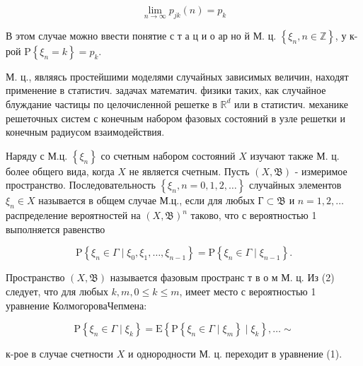 \documentclass[10pt]{article}
\begin{document}
\[

\lim _{n \rightarrow \infty} p_{j k}(n)=p_{k}

\]



В этом случае можно ввести понятие с т а ц и о ар но й М. ц. $\left\{\xi_{n}, n \in \mathbb{Z}\right\}$, у к-рой $\mathrm{P}\left\{\xi_{n}=k\right\}=p_{k}$.



М. ц., являясь простейшими моделями случайных зависимых величин, находят применение в статистич. задачах математич. физики таких, как случайное блуждание частицы по целочисленной решетке в $\mathbb{R}^{d}$ или в статистич. механике решеточных систем с конечным набором фазовых состояний в узле решетки и конечным радиусом взаимодействия.



Наряду с М.ц. $\left\{\xi_{n}\right\}$ со счетным набором состояний $X$ изучают также М. ц. более общего вида, когда $X$ не является счетным. Пусть $(X, \mathfrak{B})$ - измеримое пространство. Последовательность $\left\{\xi_{n}, n=0,1,2, \ldots\right\}$ случайных элементов $\xi_{n} \in X$ называется в общем случае М.ц., если для любых $Г \subset \mathfrak{B}$ и $n=1,2, \ldots$ распределение вероятностей на $(X, \mathfrak{B})^{n}$ таково, что с вероятностью 1 выполняется равенство



\[

\mathrm{P}\left\{\xi_{n} \in \Gamma \mid \xi_{0}, \xi_{1}, \ldots, \xi_{n-1}\right\}=\mathrm{P}\left\{\xi_{n} \in \Gamma \mid \xi_{n-1}\right\} .

\]



Пространство $(X, \mathfrak{B})$ называется фазовым пространс т в о м М. ц. Из (2) следует, что для любых $k, m, 0 \leqslant k \leqslant m$, имеет место с вероятностью 1 уравнение КолмогороваЧепмена:



\[

\mathrm{P}\left\{\xi_{n} \in \Gamma \mid \xi_{k}\right\}=\mathrm{E}\left\{\mathrm{P}\left\{\xi_{n} \in \Gamma \mid \xi_{m}\right\} \mid \xi_{k}\right\}, \ldots \sim

\]



к-рое в случае счетности $X$ и однородности М. ц. переходит в уравнение (1).
\end{document}
